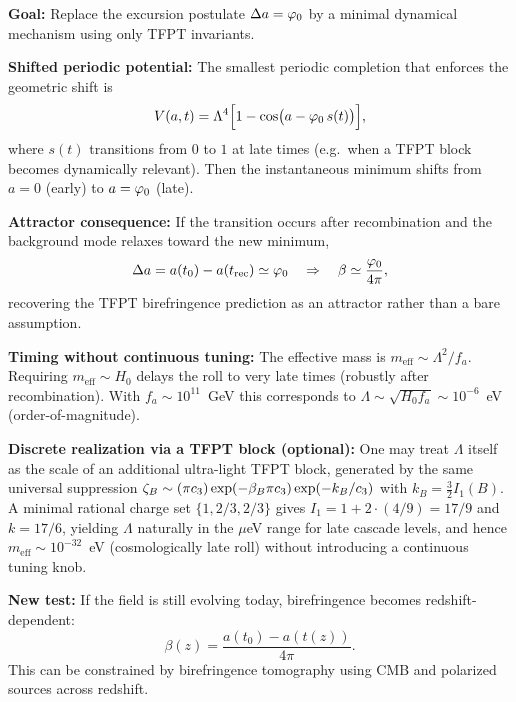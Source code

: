 \begin{tcolorbox}[colback=red!3, colframe=red!50!black, 
    title={\textbf{Dynamical Completion: Late-Time Shifted Axion Attractor}}, fonttitle=\bfseries\small]
\textbf{Goal:} Replace the excursion postulate $\Delta a=\varphi_0$ by a minimal dynamical mechanism using only TFPT invariants.

\textbf{Shifted periodic potential:} The smallest periodic completion that enforces the geometric shift is
\begin{equation}
    V(a,t)=\Lambda^4\Bigl[1-\cos\bigl(a-\varphi_0\,s(t)\bigr)\Bigr],
    \label{eq:shifted-axion-potential}
\end{equation}
where $s(t)$ transitions from $0$ to $1$ at late times (e.g.\ when a TFPT block becomes dynamically relevant).
Then the instantaneous minimum shifts from $a=0$ (early) to $a=\varphi_0$ (late).

\textbf{Attractor consequence:} If the transition occurs after recombination and the background mode relaxes toward the new minimum,
\begin{equation}
    \Delta a = a(t_0)-a(t_{\mathrm{rec}}) \simeq \varphi_0
    \quad\Rightarrow\quad
    \beta \simeq \frac{\varphi_0}{4\pi},
\end{equation}
recovering the TFPT birefringence prediction as an attractor rather than a bare assumption.

\textbf{Timing without continuous tuning:} The effective mass is $m_{\mathrm{eff}}\sim \Lambda^2/f_a$.
Requiring $m_{\mathrm{eff}}\sim H_0$ delays the roll to very late times (robustly after recombination). With $f_a\sim 10^{11}$~GeV this corresponds to
$\Lambda\sim \sqrt{H_0 f_a}\sim 10^{-6}$~eV (order-of-magnitude).

\textbf{Discrete realization via a TFPT block (optional):} One may treat $\Lambda$ itself as the scale of an additional ultra-light TFPT block,
generated by the same universal suppression $\zeta_B \sim (\pi c_3)\exp(-\beta_B\pi c_3)\exp(-k_B/c_3)$ with $k_B=\frac{3}{2}I_1(B)$.
A minimal rational charge set $\{1,2/3,2/3\}$ gives $I_1=1+2\cdot(4/9)=17/9$ and $k=17/6$, yielding $\Lambda$ naturally in the $\mu$eV range for late cascade levels,
and hence $m_{\mathrm{eff}}\sim 10^{-32}$~eV (cosmologically late roll) without introducing a continuous tuning knob.

\textbf{New test:} If the field is still evolving today, birefringence becomes redshift-dependent:
\begin{equation}
    \beta(z)=\frac{a(t_0)-a(t(z))}{4\pi}.
\end{equation}
This can be constrained by birefringence tomography using CMB and polarized sources across redshift.
\end{tcolorbox}

